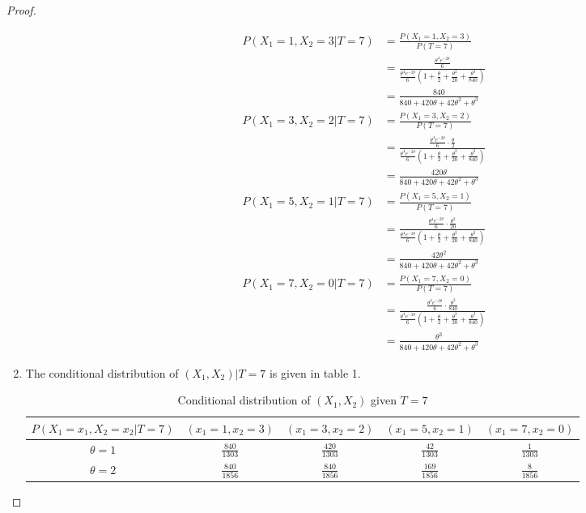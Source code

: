 \documentclass[a4paper, 11pt]{article}
\begin{document}
\begin{proof}
\begin{enumerate}[label=(\alph*)]
	\begin{align*}
    P\left(\left.X_1=1,X_2=3\right|T=7\right)& =   \frac{P\left(X_1=1,X_2=3\right)}{P\left(T=7\right)}\\ 
    & = \frac{ \frac{\theta^4e^{-2\theta}}{6}}{ \frac{\theta^4e^{-2\theta}}{6}\left(1+ \frac{\theta}{2}+\frac{\theta^2}{20}+\frac{\theta^3}{840}\right)}\\
    & = \frac{840}{840+420\theta+42\theta^2+\theta^3}\\
    P\left(\left.X_1=3,X_2=2\right|T=7\right)& =\frac{P\left(X_1=3,X_2=2\right)}{P\left(T=7\right)} \\& =\frac{ \frac{\theta^4e^{-2\theta}}{6}\cdot \frac{\theta}{2}
}{ \frac{\theta^4e^{-2\theta}}{6}\left(1+ \frac{\theta}{2}+\frac{\theta^2}{20}+\frac{\theta^3}{840}\right)}\\
& = \frac{420\theta}{840+420\theta+42\theta^2+\theta^3} \\P\left(\left.X_1=5,X_2=1\right|T=7\right)& =\frac{P\left(X_1=5,X_2=1\right)}{P\left(T=7\right)} \\
& =\frac{ \frac{\theta^4e^{-2\theta}}{6}\cdot \frac{\theta^2}{20}
}{ \frac{\theta^4e^{-2\theta}}{6}\left(1+ \frac{\theta}{2}+\frac{\theta^2}{20}+\frac{\theta^3}{840}\right)}\\
& = \frac{42\theta^2}{840+420\theta+42\theta^2+\theta^3}\\
P\left(\left.X_1=7,X_2=0\right|T=7\right)& =\frac{P\left(X_1=7,X_2=0\right)}{P\left(T=7\right)} \\
& =\frac{ \frac{\theta^4e^{-2\theta}}{6}\cdot \frac{\theta^3}{840}
}{ \frac{\theta^4e^{-2\theta}}{6}\left(1+ \frac{\theta}{2}+\frac{\theta^2}{20}+\frac{\theta^3}{840}\right)}\\
& = \frac{\theta^3}{840+420\theta+42\theta^2+\theta^3}
	\end{align*}
	
	
	
	\item 
	
	The conditional distribution of $(X_1,X_2)|T=7$ is given in table 1.
	
	\begin{table}[H]
		\centering
		\caption{Conditional distribution of $(X_1,X_2)$ given $T=7$}
		\begin{tabular}{c|cccc}
			\hline
		$P(X_1=x_1,X_2=x_2|T=7)$	& $(x_1=1,x_2=3)$ & $(x_1=3,x_2=2)$ & $(x_1=5,x_2=1)$& $(x_1=7,x_2=0)$ \\ 
			\hline
			$\theta=1$ & $\frac{840}{1303}$ & $\frac{420}{1303}$ & $\frac{42}{1303}$& $\frac{1}{1303}$ \\ 
			\hline
			$\theta=2$ & $\frac{840}{1856}$& $\frac{840}{1856}$ &  $\frac{169}{1856}$ & $\frac{8}{1856}$ \\ 
			\hline
		\end{tabular}
	\end{table}
\end{enumerate}
\end{proof}
\end{document}
